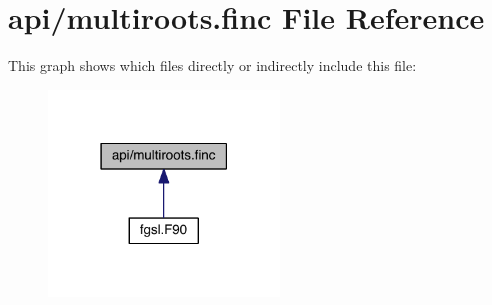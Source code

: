 \hypertarget{multiroots_8finc}{\section{api/multiroots.finc File Reference}
\label{multiroots_8finc}
}
This graph shows which files directly or indirectly include this file\-:\nopagebreak
\begin{figure}[H]
\begin{center}
\leavevmode
\includegraphics[width=174pt]{multiroots_8finc__dep__incl}
\end{center}
\end{figure}
